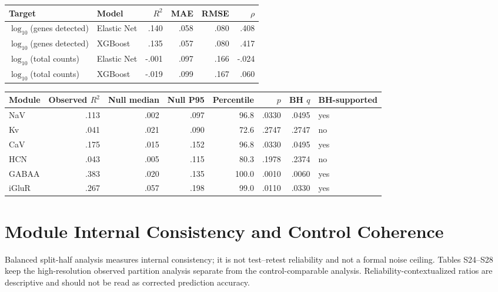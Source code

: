 \documentclass[11pt]{article}
\newcommand{\tablefont}{\fontsize{9.5}{11.2}\selectfont}
\newcommand{\sourcecaption}[1]{\Needspace{10\baselineskip}\vspace{2pt}{\small\bfseries #1}\par\vspace{2pt}}
\begin{document}
\sourcecaption{Technical-target OOF performance (Table S22).}
\begin{center}\tablefont
\begin{tabular}{llrrrr}
\toprule
Target & Model & $R^2$ & MAE & RMSE & $\rho$ \\
\midrule
$\log_{10}$(genes detected) & Elastic Net & .140 & .058 & .080 & .408 \\
$\log_{10}$(genes detected) & XGBoost & .135 & .057 & .080 & .417 \\
$\log_{10}$(total counts) & Elastic Net & -.001 & .097 & .166 & -.024 \\
$\log_{10}$(total counts) & XGBoost & -.019 & .099 & .167 & .060 \\
\bottomrule
\end{tabular}
\end{center}

\sourcecaption{Matched-control specificity after fold-local technical residualization (Table S23; separate 6-test family).}
\begin{center}\tablefont
\begin{tabular}{lrrrrrrl}
\toprule
Module & Observed $R^2$ & Null median & Null P95 & Percentile & $p$ & BH $q$ & BH-supported \\
\midrule
NaV & .113 & .002 & .097 & 96.8 & .0330 & .0495 & yes \\
Kv & .041 & .021 & .090 & 72.6 & .2747 & .2747 & no \\
CaV & .175 & .015 & .152 & 96.8 & .0330 & .0495 & yes \\
HCN & .043 & .005 & .115 & 80.3 & .1978 & .2374 & no \\
GABAA & .383 & .020 & .135 & 100.0 & .0010 & .0060 & yes \\
iGluR & .267 & .057 & .198 & 99.0 & .0110 & .0330 & yes \\
\bottomrule
\end{tabular}
\end{center}

\section{Module Internal Consistency and Control Coherence}
Balanced split-half analysis measures internal consistency; it is not test--retest reliability and not a formal noise ceiling. Tables S24--S28 keep the high-resolution observed partition analysis separate from the control-comparable analysis. Reliability-contextualized ratios are descriptive and should not be read as corrected prediction accuracy.
\end{document}
